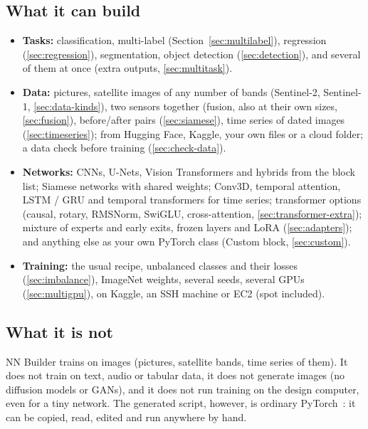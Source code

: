 \documentclass[11pt,a4paper]{article}
\begin{document}
\subsection{What it can build}
\begin{itemize}[nosep]
  \item \textbf{Tasks:} classification, multi-label (Section~\ref{sec:multilabel}), regression (\ref{sec:regression}), segmentation,
        object detection (\ref{sec:detection}), and several of them at once (extra outputs, \ref{sec:multitask}).
  \item \textbf{Data:} pictures, satellite images of any number of bands (Sentinel-2, Sentinel-1, \ref{sec:data-kinds}), two sensors
        together (fusion, also at their own sizes, \ref{sec:fusion}), before/after pairs (\ref{sec:siamese}), time series of dated images
        (\ref{sec:timeseries}); from Hugging Face, Kaggle, your own files or a cloud folder; a data check before training
        (\ref{sec:check-data}).
  \item \textbf{Networks:} CNNs, U-Nets, Vision Transformers and hybrids from the block list; Siamese networks with shared weights;
        Conv3D, temporal attention, LSTM / GRU and temporal transformers for time series; transformer options (causal, rotary, RMSNorm,
        SwiGLU, cross-attention, \ref{sec:transformer-extra}); mixture of experts and early exits, frozen layers and LoRA
        (\ref{sec:adapters}); and anything else as your own PyTorch class (Custom block, \ref{sec:custom}).
  \item \textbf{Training:} the usual recipe, unbalanced classes and their losses (\ref{sec:imbalance}), ImageNet weights, several seeds,
        several GPUs (\ref{sec:multigpu}), on Kaggle, an SSH machine or EC2 (spot included).
\end{itemize}

\subsection{What it is not}
NN Builder trains on images (pictures, satellite bands, time series of them). It does not train on text, audio or tabular data, it
does not generate images (no diffusion models or GANs), and it does not run training on the design computer, even for a tiny network. The generated script, however, is ordinary PyTorch~\cite{paszke2019pytorch}:
it can be copied, read, edited and run anywhere by hand.

\end{document}
